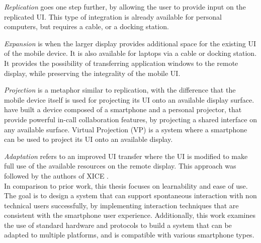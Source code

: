 \emph{Replication} goes one step further, by allowing the user to provide input on the replicated UI.
This type of integration is already available for personal computers, but requires a cable, or a docking station.

\emph{Expansion} is when the larger display provides additional space for the existing UI of the mobile device.
It is also available for laptops via a cable or docking station.
It provides the possibility of transferring application windows to the remote display, while preserving the integrality of the mobile UI.

\emph{Projection} is a metaphor similar to replication, with the difference that the mobile device itself is used for projecting its UI onto an available display surface.
\cite{Winkler:2011:interactivephonecall} have built a device composed of a smartphone and a personal projector, that provide powerful in-call collaboration features, by projecting a shared interface on any available surface.
Virtual Projection (VP) \citep{Baur:2012:virtualprojection} is a system where a smartphone can be used to project its UI onto an available display.

\emph{Adaptation} refers to an improved UI transfer where the UI is modified to make full use of the available resources on the remote display.
This approach was followed by the authors of XICE \citep{Arthur:2011:xice}.
\\
\linebreak
In comparison to prior work, this thesis focuses on learnability and ease of use.
The goal is to design a system that can support spontaneous interaction with non technical users successfully, by implementing interaction techniques that are consistent with the smartphone user experience.
Additionally, this work examines the use of standard hardware and protocols to build a system that can be adapted to multiple platforms, and is compatible with various smartphone types.

